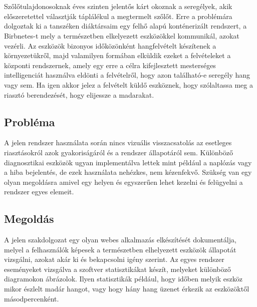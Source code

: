 \chapter{\bevezetes}
Szőlőtulajdonosoknak éves szinten jelentős kárt okoznak a seregélyek, akik előszeretettel választják táplálékul a megtermelt szőlőt.
Erre a problémára dolgoztak ki a tanszéken diáktársaim egy felhő alapú konténerizált rendszert, a Birbnetes-t
mely a természetben elkelyezett eszközökkel kommunikál, azokat vezérli.
Az eszközök bizonyos időközönként hangfelvételt készítenek a környezetükről,
majd valamilyen formában elküldik ezeket a felvételeket a központi rendszernek,
amely egy erre a célra kifejlesztett mesterséges intelligenciát használva eldönti
a felvételről, hogy azon található-e seregély hang vagy sem.
Ha igen akkor jelez a felvételt küldő eszköznek, hogy szólaltassa meg a riasztó
berendezését, hogy elijessze a madarakat.

\section{Probléma}
A jelen rendszer használata során nincs vizuális visszacsatolás az esetleges riasztásokról azok gyakoriságáról
és a rendszer állapotáról sem. Különböző diagnosztikai eszközök ugyan implementálva lettek mint például
a naplózás vagy a hiba bejelentés, de ezek használata nehézkes, nem kézenfekvő. 
Szükség van egy olyan megoldásra amivel egy helyen és egyszerűen lehet kezelni és felügyelni a rendszer egyes elemeit.

\section{Megoldás}
A jelen szakdolgozat egy olyan webes alkalmazás elkészítését dokumentálja, melyel a felhasználók képesek
a természetben elhelyezett eszközök állapotát vizsgálni, azokat akár ki és bekapcsolni igény szerint.
Az egyes rendszer eseményeket vizsgálva a szoftver statisztikákat készít, melyeket különböző diagramokon ábrázolok.
Ilyen statisztikák például, hogy időben melyik eszköz mikor észlelt madár hangot, vagy hogy hány hang üzenet érkezik
az eszközöktől másodpercenként.

